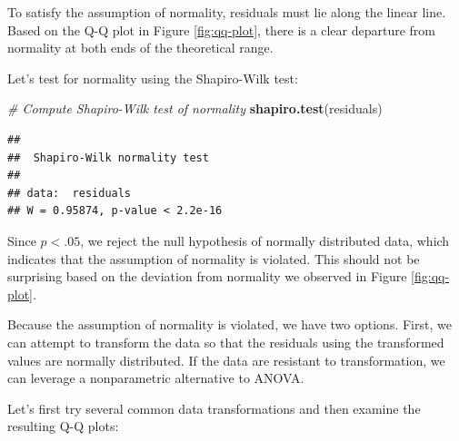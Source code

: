 \documentclass[]{book}
\newenvironment{Shaded}{\begin{snugshade}}{\end{snugshade}}
\newcommand{\CommentTok}[1]{\textcolor[rgb]{0.56,0.35,0.01}{\textit{#1}}}
\newcommand{\KeywordTok}[1]{\textcolor[rgb]{0.13,0.29,0.53}{\textbf{#1}}}
\newcommand{\NormalTok}[1]{#1}
\begin{document}
To satisfy the assumption of normality, residuals must lie along the linear line. Based on the Q-Q plot in Figure \ref{fig:qq-plot}, there is a clear departure from normality at both ends of the theoretical range.

Let's test for normality using the Shapiro-Wilk test:

\begin{Shaded}
\begin{Highlighting}[]
\CommentTok{# Compute Shapiro-Wilk test of normality}
\KeywordTok{shapiro.test}\NormalTok{(residuals)}
\end{Highlighting}
\end{Shaded}

\begin{verbatim}
## 
##  Shapiro-Wilk normality test
## 
## data:  residuals
## W = 0.95874, p-value < 2.2e-16
\end{verbatim}

Since \(p < .05\), we reject the null hypothesis of normally distributed data, which indicates that the assumption of normality is violated. This should not be surprising based on the deviation from normality we observed in Figure \ref{fig:qq-plot}.

Because the assumption of normality is violated, we have two options. First, we can attempt to transform the data so that the residuals using the transformed values are normally distributed. If the data are resistant to transformation, we can leverage a nonparametric alternative to ANOVA.

Let's first try several common data transformations and then examine the resulting Q-Q plots:
\end{document}
